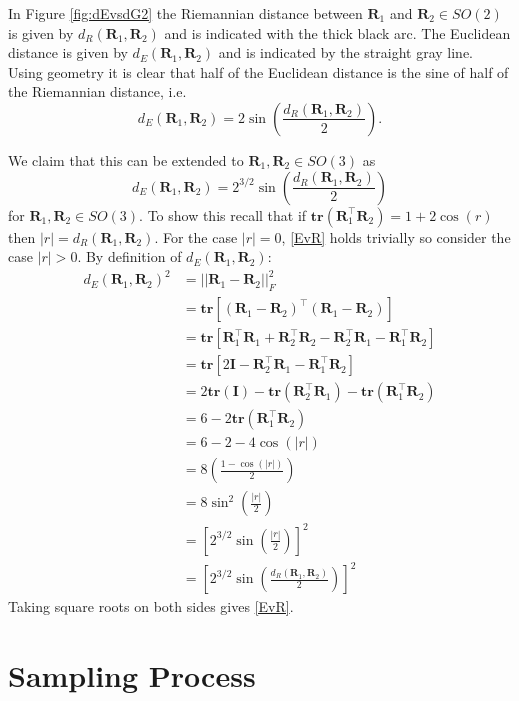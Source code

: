 \documentclass[12pt]{article}
\newcommand{\tr}{{\mathbf{tr}}}
\newcommand{\Rdist}{{d_R}}
\newcommand{\Edist}{{d_E}}
\begin{document}
\noindent In Figure \ref{fig:dEvsdG2} the Riemannian distance between $\bm R_1$ and $\bm R_2\in SO(2)$ is given by $\Rdist(\bm R_1,\bm R_2)$ and is indicated with the thick black arc.  The Euclidean distance is given by $\Edist(\bm R_1,\bm R_2)$ and is indicated by the straight gray line.  Using geometry it is clear that half of the Euclidean distance is the sine of half of the Riemannian distance, i.e.
\[
\Edist(\bm R_1,\bm R_2)=2\sin\left(\frac{\Rdist(\bm R_1,\bm R_2)}{2}\right).
\]

\noindent We claim that this can be extended to $\bm R_1,\bm R_2 \in SO(3)$ as 
\begin{equation}\label{EvR}
\Edist (\bm{R}_1,\bm{R}_2)=2^{3/2}\sin\left(\frac{\Rdist(\bm{R}_1,\bm{R}_2)}{2}\right)
\end{equation}
for $\bm{R}_1,\bm{R}_2\in SO(3)$.  To show this recall that if $\tr(\bm R_1^\top\bm R_2)=1+2\cos(r)$ then $|r|=\Rdist(\bm R_1,\bm R_2)$.  For the case $|r|=0$, \eqref{EvR} holds trivially so consider the case $|r|>0$.  By definition of $\Edist (\bm R_1,\bm R_2)$:
\begin{align*}
\Edist (\bm R_1,\bm R_2)^2
&=||\bm R_1-\bm R_2||_F^2\\
&=\tr\left[(\bm R_1-\bm R_2)^\top(\bm R_1-\bm R_2)\right]\\
&=\tr\left[\bm R_1^\top\bm R_1+\bm R_2^\top\bm R_2-\bm R_2^\top\bm R_1-\bm R_1^\top\bm R_2\right]\\
&=\tr\left[2\bm{I}-\bm R_2^\top\bm R_1-\bm R_1^\top\bm R_2\right]\\
&=2\tr(\bm{I})-\tr(\bm R_2^\top\bm R_1)-\tr(\bm R_1^\top\bm R_2)\\
&=6-2\tr(\bm R_1^\top\bm R_2)\\
&=6-2-4\cos(|r|)\\
&=8\left(\frac{1-\cos(|r|)}{2}\right)\\
&=8\sin^2\left(\frac{|r|}{2}\right)\\
&=\left[2^{3/2}\sin\left(\frac{|r|}{2}\right)\right]^2\\
&=\left[2^{3/2}\sin\left(\frac{\Rdist(\bm R_1,\bm R_2)}{2}\right)\right]^2
\end{align*}
Taking square roots on both sides gives \eqref{EvR}.

\section{Sampling Process}
\label{sec:appendix1}
\end{document}
